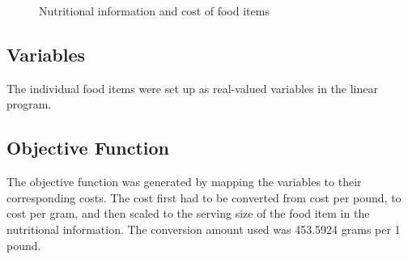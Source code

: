 \documentclass[paper=a4, fontsize=11pt]{scrartcl}
\numberwithin{equation}{section}		%
\numberwithin{figure}{section}			%
\numberwithin{table}{section}				%
\begin{document}
\begin{figure}


  \caption{Nutritional information and cost of food items}
  \label{Fig:Foods}
\end{figure}

\subsection{Variables}
The individual food items were set up as real-valued variables in the linear program. 

\subsection{Objective Function}
The objective function was generated by mapping the variables to their corresponding costs. The cost first had to be converted from cost per pound, to cost per gram, and then scaled to the serving size of the food item in the nutritional information. The conversion amount used was 453.5924 grams per 1 pound.
\end{document}
